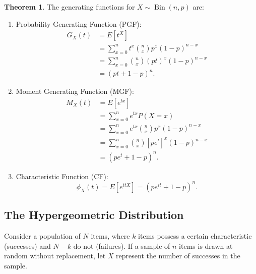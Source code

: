 \documentclass[12pt,a4paper]{report}
\theoremstyle{definition}
\newtheorem{thm}{Theorem}[section]
\theoremstyle{plain}
\theoremstyle{definition}
\begin{document}
\begin{thm}
The generating functions for $X \sim \operatorname{Bin}(n, p)$ are:
\begin{enumerate}
\item Probability Generating Function (PGF):
\begin{align*}
G_X(t) &= E[t^X]\\
& = \sum_{x=0}^n t^x \binom{n}{x} p^x (1-p)^{n-x}\\
&= \sum_{x=0}^n \binom{n}{x} (pt)^x (1-p)^{n-x}\\
& = (pt + 1 - p)^n.
\end{align*}

\item Moment Generating Function (MGF):
\begin{align*}
M_X(t) &= E\left[e^{tx}\right]\\
& =\sum^n_{x=0}e^{tx}P(X=x)\\
&=\sum^n_{x=0}e^{tx}\binom{n}{x}p^x(1-p)^{n-x}\\
&=\sum^n_{x=0}\binom{n}{x}\left[pe^t\right]^x(1-p)^{n-x}\\
& = (pe^t+1-p)^n.
\end{align*}





\item Characteristic Function (CF):
\[ \phi_X(t) = E[e^{itX}] = (pe^{it} + 1 - p)^n. \]
\end{enumerate}\end{thm}




\subsection{The Hypergeometric Distribution}
\vspace{-15pt}
Consider a population of $N$ items, where $k$ items possess a certain characteristic (successes) and $N-k$ do not (failures). If a sample of $n$ items is drawn at random without replacement, let $X$ represent the number of successes in the sample.
\end{document}
